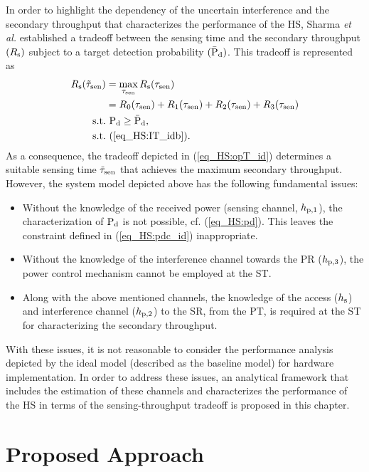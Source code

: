 In order to highlight the dependency of the uncertain interference and the secondary throughput that characterizes the performance of the HS, Sharma \textit{et al.} \cite{Sharma14} established a tradeoff between the sensing time and the secondary throughput $(R_{\text{s}})$ subject to a target detection probability $(\bar{\text{P}}_{\text{d}})$. This tradeoff is represented as
\begin{align}
R_{\text{s}}(\tilde{\tau}_{\text{sen}}) &= \operatorname*{max}_{\tau_{\text{sen}}} R_{\text{s}}(\tau_{\text{sen}}) \label{eq_HS:opT_id}\\ 
\quad &= R_{\text{0}}(\tau_{\text{sen}}) + R_{\text{1}}(\tau_{\text{sen}}) + R_{\text{2}}(\tau_{\text{sen}}) + R_{\text{3}}(\tau_{\text{sen}}) \nonumber  \\
\text{s.t.} & \text{ } \text{P}_{\text{d}} \ge \bar{\text{P}}_{\text{d}}, \label{eq_HS:pdc_id} \\ 
\text{s.t.} & \text{ } (\ref{eq_HS:IT_idb}). \nonumber
\end{align}
As a consequence, the tradeoff depicted in (\ref{eq_HS:opT_id}) determines a suitable sensing time $\tilde{\tau}_{\text{sen}}$ that achieves the maximum secondary throughput.
However, the system model depicted above has the following fundamental issues:
\begin{itemize}
\item Without the knowledge of the received power (sensing channel, $h_{\text{p,1}}$), the characterization of $\text{P}_{\text{d}}$ is not possible, cf. (\ref{eq_HS:pd}). This leaves the constraint defined in (\ref{eq_HS:pdc_id}) inappropriate. 
\item Without the knowledge of the interference channel towards the PR ($h_{\text{p,3}}$), the power control mechanism cannot be employed at the ST.
\item Along with the above mentioned channels, the knowledge of the access ($h_{\text{s}}$) and interference channel ($h_{\text{p,2}}$) to the SR, from the PT, is required at the ST for characterizing the secondary throughput. 
\end{itemize} 
With these issues, it is not reasonable to consider the performance analysis depicted by the ideal model (described as the baseline model) for hardware implementation. In order to address these issues, an analytical framework that includes the estimation of these channels and characterizes the performance of the HS in terms of the sensing-throughput tradeoff is proposed in this chapter. 
\section{Proposed Approach} \label{sec:pm}
